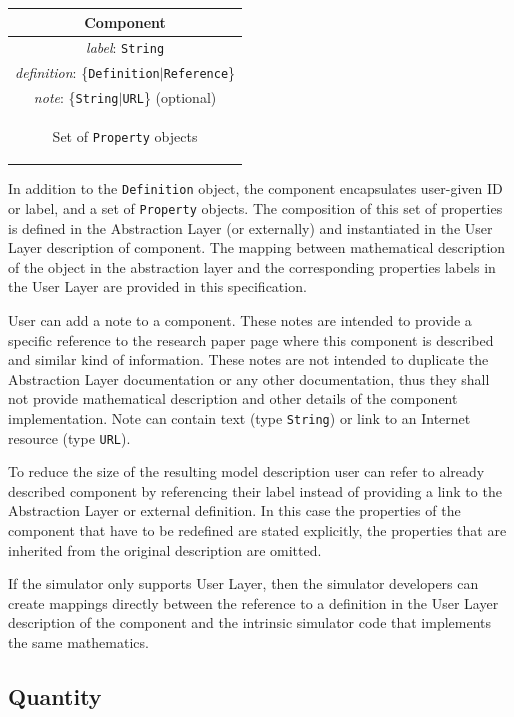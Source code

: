 \documentclass{article}
\begin{document}
\begin{table}[htb]
\center
\begin{tabular}{|c|}
\hline
\hline
Component \\
\hline
\hline
{\em label}: {\tt String} \\
\hline
{\em definition}: \{{\tt Definition}$|${\tt Reference}\}\\
\hline
{\em note}: \{{\tt String}$|${\tt URL}\} (optional)\\
\hline
\colorbox{issuecolor}{\parbox{0.4\linewidth}
{\center Set of {\tt Property} objects}} \\
\hline
\end{tabular}
\end{table}

In addition to the {\tt Definition} object, the component encapsulates
user-given ID or label, and a set of {\tt Property} objects. The composition
of this set of properties is defined in the Abstraction Layer (or externally)
and instantiated in the User Layer description of component. The mapping
between mathematical description of the object in the abstraction
layer and the corresponding properties labels in the User Layer are
provided in this specification.

User can add a note to a component. These notes are intended to provide
a specific reference to the research paper page where this component is
described and similar kind of information. These notes are not intended
to duplicate the Abstraction Layer documentation or any other
documentation, thus they shall not provide mathematical description and
other details of the component implementation. Note can contain text
(type {\tt String}) or link to an Internet resource (type {\tt URL}).

To reduce the size of the resulting model description user can refer to
already described component by referencing their label instead of providing
a link to the Abstraction Layer or external definition. In this case the
properties of the component that have to be redefined are stated explicitly,
the properties that are inherited from the original description are omitted.

If the simulator only supports User Layer, then the simulator developers
can create mappings directly between the reference to a definition in the
User Layer description of the component and the intrinsic simulator code
that implements the same mathematics.

\subsection{Quantity}
\label{quantity}
\end{document}
